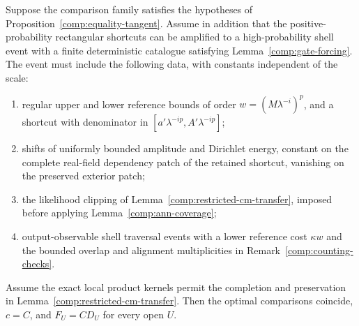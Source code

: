 \begin{proposition}
\label{comp:rigidity-implication}
Suppose the comparison family satisfies the hypotheses of
Proposition~\ref{comp:equality-tangent}.  Assume in addition that the
positive-probability rectangular shortcuts can be amplified to a
high-probability shell event with a finite deterministic catalogue
satisfying Lemma~\ref{comp:gate-forcing}.  The event must include the
following data, with constants independent of the scale:
\begin{enumerate}[label=(\alph*)]
\item regular upper and lower reference bounds of order
$w=(M\lambda^{-i})^p$, and a shortcut with denominator in
$[a'\lambda^{-ip},A'\lambda^{-ip}]$;
\item shifts of uniformly bounded amplitude and Dirichlet energy,
constant on the complete real-field dependency patch of the retained
shortcut, vanishing on the preserved exterior patch;
\item the likelihood clipping of
Lemma~\ref{comp:restricted-cm-transfer}, imposed before applying
Lemma~\ref{comp:ann-coverage};
\item output-observable shell traversal events with a lower reference
cost $\kappa w$ and the bounded overlap and alignment multiplicities
in Remark~\ref{comp:counting-checks}.
\end{enumerate}
Assume the exact local product kernels permit the completion and
preservation in Lemma~\ref{comp:restricted-cm-transfer}.
Then the optimal comparisons coincide, $c=C$, and
$F_U=CD_U$ for every open $U$.
\end{proposition}

